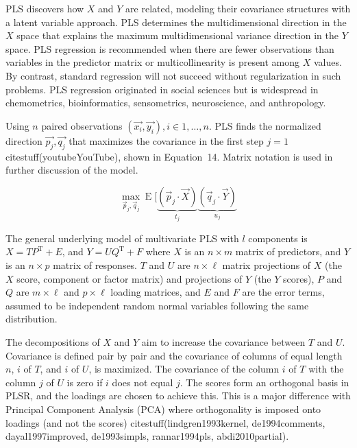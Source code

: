 \documentclass[preprint,12pt]{elsarticle}
\begin{document}
PLS discovers how $X$ and $Y$ are related, modeling their covariance structures with a latent variable approach. PLS determines the multidimensional direction in the $X$ space that explains the maximum multidimensional variance direction in the $Y$ space. PLS regression is recommended when there are fewer observations than variables in the predictor matrix or multicollinearity is present among $X$ values. By contrast, standard regression will not succeed without regularization in such problems. PLS regression originated in social sciences but is widespread in chemometrics, bioinformatics, sensometrics, neuroscience, and anthropology.

Using $n$ paired observations $\left(\vec{x_{i}}, \vec{y_{i}}\right), i \in 1, \dots, n$. PLS finds the normalized direction $\vec{p_{j}}, \vec{q_{j}}$ that maximizes the covariance in the first step $j = 1$ citestuff(youtubeYouTube), shown in Equation~14. Matrix notation is used in further discussion of the model.

\begin{equation}
	\max_{{\vec{p}}_{j},{\vec{q}}_{j}}\operatorname{E} [\underbrace{({\vec{p}}_{j}\cdot {\vec{X}})}_{t_{j}}\underbrace{({\vec{q}}_{j}\cdot {\vec{Y}})}_{u_{j}}
	\label{eqn:14}
\end{equation}

The general underlying model of multivariate PLS with $l$ components is $X=TP^{\mathrm{T}}+E$, and $Y=UQ^{\mathrm{T}}+F$ where $X$ is an $n\times m$ matrix of predictors, and $Y$ is an $n\times p$ matrix of responses. $T$ and $U$ are $n\times \ell$ matrix projections of $X$ (the $X$ score, component or factor matrix) and projections of $Y$ (the $Y$ scores), $P$ and $Q$ are $m\times \ell $ and $p\times \ell $ loading matrices, and $E$ and $F$ are the error terms, assumed to be independent random normal variables following the same distribution.

The decompositions of $X$ and $Y$ aim to increase the covariance between $T$ and $U$. Covariance is defined pair by pair and the covariance of columns of equal length $n$, $i$ of $T$, and $i$ of $U$, is maximized. The covariance of the column $i$ of $T$ with the column $j$ of $U$ is zero if $i$ does not equal $j$.
The scores form an orthogonal basis in PLSR, and the loadings are chosen to achieve this. This is a major difference with Principal Component Analysis (PCA) where orthogonality is imposed onto loadings (and not the scores) citestuff(lindgren1993kernel, de1994comments, dayal1997improved, de1993simpls, rannar1994pls, abdi2010partial).
\end{document}
